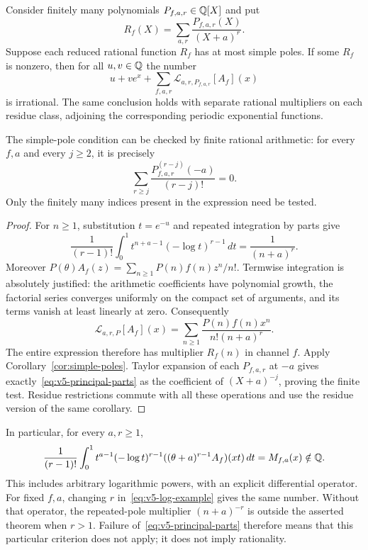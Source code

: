 \begin{proposition}
\label{prop:v5-log-kernels}
Consider finitely many polynomials $P_{f,a,r}\in\mathbb Q[X]$ and put
\[
 R_f(X)=\sum_{a,r}\frac{P_{f,a,r}(X)}{(X+a)^r}.
\]
Suppose each reduced rational function $R_f$ has at most simple poles.
If some $R_f$ is nonzero, then for all $u,v\in\mathbb Q$ the number
\[
 u+v e^x+\sum_{f,a,r}\mathscr L_{a,r,P_{f,a,r}}[A_f](x)
\]
is irrational.  The same conclusion holds with separate rational
multipliers on each residue class, adjoining the corresponding
periodic exponential functions.

The simple-pole condition can be checked by finite rational arithmetic:
for every $f,a$ and every $j\geq2$, it is precisely
\begin{equation}
 \sum_{r\geq j}
 \frac{P_{f,a,r}^{(r-j)}(-a)}{(r-j)!}=0.
 \label{eq:v5-principal-parts}
\end{equation}
Only the finitely many indices present in the expression need be tested.
\end{proposition}
\begin{proof}
For $n\geq1$, substitution $t=e^{-u}$ and repeated integration by parts
give
\[
 \frac1{(r-1)!}\int_0^1t^{n+a-1}(-\log t)^{r-1}\,dt
 =\frac1{(n+a)^r}.
\]
Moreover $P(\theta)A_f(z)=\sum_{n\geq1}P(n)f(n)z^n/n!$.
Termwise integration is absolutely justified: the arithmetic coefficients
have polynomial growth, the factorial series converges uniformly on the
compact set of arguments, and its terms vanish at least linearly at zero.
Consequently
\[
 \mathscr L_{a,r,P}[A_f](x)
 =\sum_{n\geq1}\frac{P(n)f(n)x^n}{n!(n+a)^r}.
\]
The entire expression therefore has multiplier $R_f(n)$ in channel $f$.
Apply Corollary~\ref{cor:simple-poles}.  Taylor expansion of each
$P_{f,a,r}$ at $-a$ gives exactly~\eqref{eq:v5-principal-parts} as the
coefficient of $(X+a)^{-j}$, proving the finite test.  Residue restrictions
commute with all these operations and use the residue version of the same
corollary.
\end{proof}

In particular, for every $a,r\geq1$,
\begin{equation}
 \frac1{(r-1)!}\int_0^1t^{a-1}(-\log t)^{r-1}
       ((\theta+a)^{r-1}A_f)(xt)\,dt
 =M_{f,a}(x)\notin\mathbb Q.
 \label{eq:v5-log-example}
\end{equation}
This includes arbitrary logarithmic powers, with an explicit differential
operator.  For fixed $f,a$, changing $r$ in~\eqref{eq:v5-log-example}
gives the same number.  Without that operator, the repeated-pole
multiplier $(n+a)^{-r}$ is outside the asserted theorem when $r>1$.
Failure of~\eqref{eq:v5-principal-parts} therefore means that this particular
criterion does not apply; it does not imply rationality.

